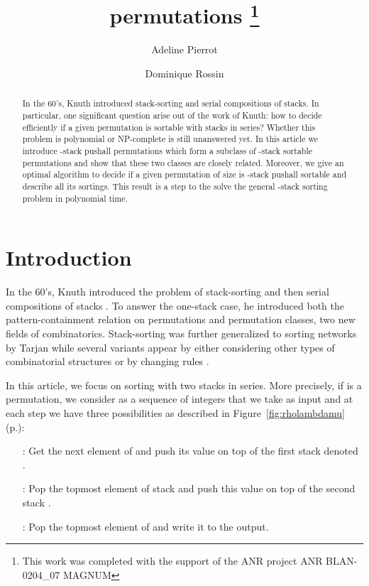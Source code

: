 \documentclass[11pt]{article}
\title{\pushall permutations \footnote{This work was completed with the support of the ANR
   project ANR BLAN-0204\_07  MAGNUM}}
\author{Adeline Pierrot \and Dominique Rossin}
\newcommand{\pushall}{-stack pushall sortable\xspace}
\begin{document}
\maketitle
\begin{abstract}
In the 60's, Knuth introduced stack-sorting and serial compositions of stacks.
In particular, one significant question arise out of the work of Knuth: 
how to decide efficiently if a given permutation is sortable with  stacks in series?
Whether this problem is polynomial or \mbox{NP-complete} is still unanswered yet.
In this article we introduce -stack pushall permutations which form a subclass of -stack sortable permutations 
and show that these two classes are closely related. 
Moreover, we give an optimal  algorithm to decide if a given permutation of size  is \pushall and describe all its sortings.
This result is a step to the solve the general -stack sorting problem in polynomial time.
\end{abstract}

\section{Introduction}

In the 60's, Knuth introduced the problem of stack-sorting \cite{Knuth68} and 
then serial compositions of stacks \cite{Knuth73}.
To answer the one-stack case, he introduced both the pattern-containment relation on permutations and permutation classes, two new fields of combinatorics. 
Stack-sorting was further generalized to sorting networks by Tarjan \cite{Tarjan72}
while several variants appear by either considering other types of combinatorial structures or by changing rules \cite{Pratt73,EvenItai71,AAL10}.

In this article, we focus on sorting with two stacks in series. 
More precisely, if  is a permutation, we consider  as a sequence of integers  that we take as input
and at each step we have three possibilities as described in Figure~\ref{fig:rholambdamu} (p.\pageref{fig:rholambdamu}):
\begin{enumerate}
\item[:] Get the next element of  and push its value on top of the first stack denoted .
\item[:] Pop the topmost element of stack  and push this value on top of the second stack .
\item[:] Pop the topmost element of  and write it to the output.
\end{enumerate}
\end{document}
